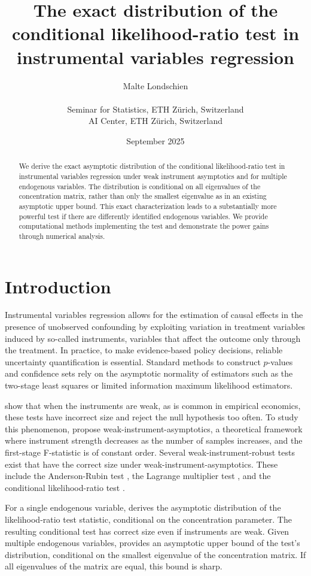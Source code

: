 \documentclass[11pt,hidelinks,a4paper]{article}
\title{
    The exact distribution of the conditional likelihood-ratio test in instrumental variables regression
}
\author{
Malte Londschien
\\
\vspace{0cm}\\
{\small Seminar for Statistics, ETH Z\"urich, Switzerland}\\
{\small AI Center, ETH Z\"urich, Switzerland}\\
}
\date{September 2025}
\begin{document}
\maketitle

\begin{abstract}
    \noindent We derive the exact asymptotic distribution of the conditional likelihood-ratio test in instrumental variables regression under weak instrument asymptotics and for multiple endogenous variables.
    The distribution is conditional on all eigenvalues of the concentration matrix, rather than only the smallest eigenvalue as in an existing asymptotic upper bound.
    This exact characterization leads to a substantially more powerful test if there are differently identified endogenous variables.
    We provide computational methods implementing the test and demonstrate the power gains through numerical analysis.
\end{abstract}

\section{Introduction}
Instrumental variables regression allows for the estimation of causal effects in the presence of unobserved confounding by exploiting variation in treatment variables induced by so-called instruments, variables that affect the outcome only through the treatment.
In practice, to make evidence-based policy decisions, reliable uncertainty quantification is essential.
Standard methods to construct $p$-values and confidence sets rely on the asymptotic normality of estimators such as the two-stage least squares or limited information maximum likelihood estimators.

\citet{staiger1997instrumental} show that when the instruments are weak, as is common in empirical economics,
these tests have incorrect size and reject the null hypothesis too often. %
To study this phenomenon, \citet{staiger1997instrumental} propose weak-instrument-asymptotics, a theoretical framework where instrument strength decreases as the number of samples increases, and the first-stage F-statistic is of constant order.
Several weak-instrument-robust tests exist that have the correct size under weak-instrument-asymptotics.
These include the Anderson-Rubin test \citep{anderson1951estimating}, the Lagrange multiplier test \citep{kleibergen2002pivotal}, and the conditional likelihood-ratio test \citep{moreira2003conditional}.

For a single endogenous variable, \citet{moreira2003conditional} derives the asymptotic distribution of the likelihood-ratio test statistic, conditional on the concentration parameter.
The resulting conditional test has correct size even if instruments are weak.
Given multiple endogenous variables, \citet{kleibergen2007generalizing} provides an asymptotic upper bound of the test's distribution, conditional on the smallest eigenvalue of the concentration matrix.
If all eigenvalues of the matrix are equal, this bound is sharp.
\end{document}
